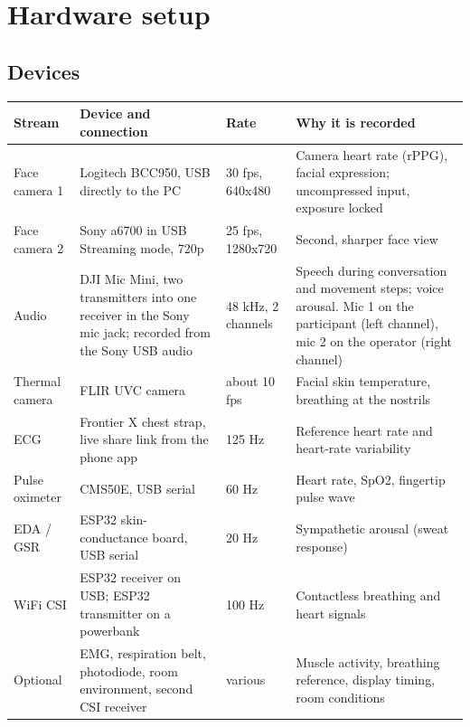 \documentclass[11pt,a4paper]{article}
\begin{document}
\section{Hardware setup}

\subsection{Devices}
\begin{longtable}{@{}p{3.2cm}p{4.3cm}p{2.1cm}p{5.6cm}@{}}
\toprule
\textbf{Stream} & \textbf{Device and connection} & \textbf{Rate} & \textbf{Why it is recorded} \\
\midrule\endhead
Face camera 1 & Logitech BCC950, USB directly to the PC & 30 fps, 640x480 & Camera heart rate (rPPG), facial expression; uncompressed input, exposure locked \\
Face camera 2 & Sony a6700 in USB Streaming mode, 720p & 25 fps, 1280x720 & Second, sharper face view \\
Audio & DJI Mic Mini, two transmitters into one receiver in the Sony mic jack; recorded from the Sony USB audio & 48 kHz, 2 channels & Speech during conversation and movement steps; voice arousal. Mic 1 on the participant (left channel), mic 2 on the operator (right channel) \\
Thermal camera & FLIR UVC camera & about 10 fps & Facial skin temperature, breathing at the nostrils \\
ECG & Frontier X chest strap, live share link from the phone app & 125 Hz & Reference heart rate and heart-rate variability \\
Pulse oximeter & CMS50E, USB serial & 60 Hz & Heart rate, SpO2, fingertip pulse wave \\
EDA / GSR & ESP32 skin-conductance board, USB serial & 20 Hz & Sympathetic arousal (sweat response) \\
WiFi CSI & ESP32 receiver on USB; ESP32 transmitter on a powerbank & 100 Hz & Contactless breathing and heart signals \\
Optional & EMG, respiration belt, photodiode, room environment, second CSI receiver & various & Muscle activity, breathing reference, display timing, room conditions \\
\bottomrule
\end{longtable}
\end{document}
